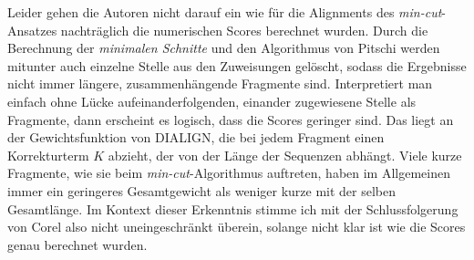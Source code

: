 Leider gehen die Autoren nicht darauf ein wie für die Alignments des \emph{min-cut}-Ansatzes nachträglich die numerischen Scores berechnet wurden. Durch die Berechnung der \emph{minimalen Schnitte} und den Algorithmus von Pitschi werden mitunter auch einzelne Stelle aus den Zuweisungen gelöscht, sodass die Ergebnisse nicht immer längere, zusammenhängende Fragmente sind. Interpretiert man einfach ohne Lücke aufeinanderfolgenden, einander zugewiesene Stelle als Fragmente, dann erscheint es logisch, dass die Scores geringer sind. Das liegt an der Gewichtsfunktion von DIALIGN, die bei jedem Fragment einen Korrekturterm $K$ abzieht, der von der Länge der Sequenzen abhängt. Viele kurze Fragmente, wie sie beim \emph{min-cut}-Algorithmus auftreten, haben im Allgemeinen immer ein geringeres Gesamtgewicht als weniger kurze mit der selben Gesamtlänge. Im Kontext dieser Erkenntnis stimme ich mit der Schlussfolgerung von Corel also nicht uneingeschränkt überein, solange nicht klar ist wie die Scores genau berechnet wurden.